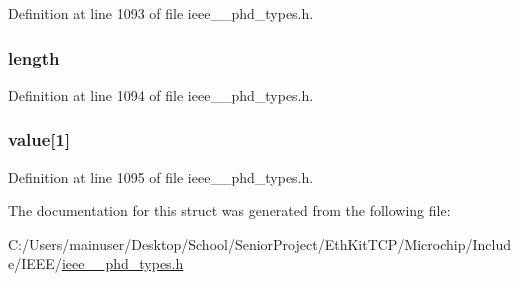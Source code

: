 Definition at line 1093 of file ieee\+\_\+\_\+phd\+\_\+types.\+h.

\hypertarget{struct___basic_nu_obs_value_cmp_a3743679e4ff85e3e1b3fc2e59973fbb3}{}
\subsubsection[{length}]{ length}\label{struct___basic_nu_obs_value_cmp_a3743679e4ff85e3e1b3fc2e59973fbb3}


Definition at line 1094 of file ieee\+\_\+\_\+phd\+\_\+types.\+h.

\hypertarget{struct___basic_nu_obs_value_cmp_a6076b90dee0eebf5dbcc2209d318301d}{}
\subsubsection[{value}]{ value\mbox{[}1\mbox{]}}\label{struct___basic_nu_obs_value_cmp_a6076b90dee0eebf5dbcc2209d318301d}


Definition at line 1095 of file ieee\+\_\+\_\+phd\+\_\+types.\+h.



The documentation for this struct was generated from the following file\+:\begin{DoxyCompactItemize}
\item 
C\+:/\+Users/mainuser/\+Desktop/\+School/\+Senior\+Project/\+Eth\+Kit\+T\+C\+P/\+Microchip/\+Include/\+I\+E\+E\+E/\hyperlink{ieee__11073__phd__types_8h}{ieee\+\_\+\_\+phd\+\_\+types.\+h}\end{DoxyCompactItemize}
